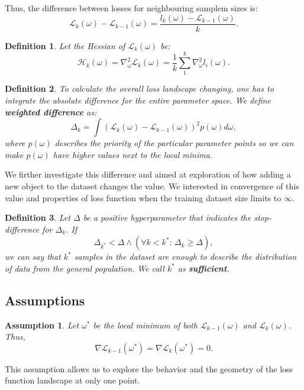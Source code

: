 \documentclass{article}
\newtheorem{definition}{Definition}
\newtheorem{assumption}{Assumption}
\begin{document}
Thus, the difference between losses for neighbouring samplem sizes is:
$$\mathcal{L}_{k}(\omega) - \mathcal{L}_{k-1}(\omega) = \frac{l_{k}(\omega) - \mathcal{L}_{k-1}(\omega)}{k}.$$

\begin{definition}
  Let the Hessian of $\mathcal{L}_k(\omega)$ be:
  $$\mathcal{H}_k(\omega) = \nabla^2_{\omega}\mathcal{L}_k(\omega) = \frac1k \sum\limits_1^k \nabla^2_{\omega} l_i(\omega).$$
\end{definition}

\begin{definition}
  To calculate the overall loss landscape changing, one has to integrate the absolute difference for the entire parameter space.
  We define \textbf{weighted difference} as:
  $$\Delta_{k} = \int \left( \mathcal{L}_{k}(\omega) - \mathcal{L}_{k-1}(\omega) \right)^2 p(\omega) d\omega,$$
  where $p(\omega)$ describes the priority of the particular parameter points so we can make $p(\omega)$ have higher values
  next to the local minima.
\end{definition}

We firther investigate this difference and aimed at exploration of how adding a new object to the dataset changes the value.
We interested in convergence of this value and properties of loss function when the training dataset size limits to $\infty$.


\begin{definition}
  Let $\Delta$ be a positive hyperparameter that indicates the stop-difference for $\Delta_k$. If
  $$\Delta_{k^*} < \Delta \wedge \left( \forall k < k^*: \, \Delta_k \geq \Delta \right),$$
  we can say that $k^*$ samples in the dataset are enough to describe the distribution of data from the general population.
  We call $k^*$ as \textbf{sufficient}.
\end{definition}

\subsection{Assumptions}

\begin{assumption}
  Let $\omega^*$ be the local minimum of both $\mathcal{L}_{k-1}(\omega)$ and $\mathcal{L}_{k}(\omega)$.
  Thus, $$\nabla \mathcal{L}_{k-1}(\omega^*) = \nabla \mathcal{L}_{k}(\omega^*) = 0.$$
\end{assumption}

This assumption allows us to explore the behavior and the geometry of the loss function landscape at only one point.
\end{document}
